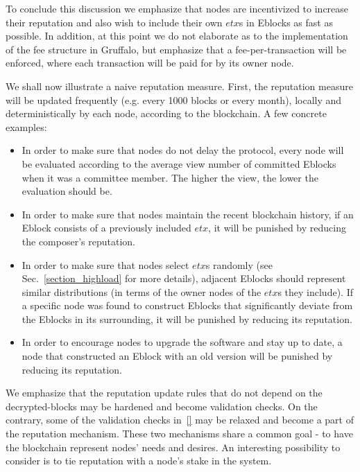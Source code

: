 To conclude this discussion we emphasize that nodes are incentivized to increase their reputation and also wish to include their own $etx$s in Eblocks as fast as possible. In addition, at this point we do not elaborate as to the implementation of the fee structure in Gruffalo, but emphasize that a fee-per-transaction will be enforced, where each transaction will be paid for by its owner node. 

We shall now illustrate a naive reputation measure. First, the reputation measure will be updated frequently (e.g. every 1000 blocks or every month), locally and deterministically by each node, according to the blockchain. A few concrete examples:
\begin{itemize}
\item In order to make sure that nodes do not delay the protocol, every node will be evaluated according to the average view number of committed Eblocks when it was a committee member. The higher the view, the lower the evaluation should be.
\item In order to make sure that nodes maintain the recent blockchain history, if an Eblock consists of a previously included $etx$, it will be punished by reducing the composer's reputation.
\item In order to make sure that nodes select $etx$s randomly (see Sec.~\ref{section_highload} for more details), adjacent Eblocks should represent similar distributions (in terms of the owner nodes of the $etx$s they include). If a specific node was found to construct Eblocks that significantly deviate from the Eblocks in its surrounding, it will be punished by reducing its reputation.
\item In order to encourage nodes to upgrade the software and stay up to date, a node that constructed an Eblock with an old version will be punished by reducing its reputation.
\end{itemize}

We emphasize that the reputation update rules that do not depend on the decrypted-blocks may be hardened and become validation checks. On the contrary, some of the validation checks in~\ref{} may be relaxed and become a part of the reputation mechanism. These two mechanisms share a common goal - to have the blockchain represent nodes' needs and desires. An interesting possibility to consider is to tie reputation with a node's stake in the system.
